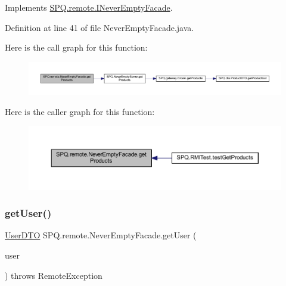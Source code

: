 Implements \mbox{\hyperlink{interface_s_p_q_1_1remote_1_1_i_never_empty_facade_a62d4a1747b8ba90f451fc9f9343055f3}{S\+P\+Q.\+remote.\+I\+Never\+Empty\+Facade}}.



Definition at line 41 of file Never\+Empty\+Facade.\+java.

Here is the call graph for this function\+:\nopagebreak
\begin{figure}[H]
\begin{center}
\leavevmode
\includegraphics[width=350pt]{class_s_p_q_1_1remote_1_1_never_empty_facade_a4c8bdeeb3d2c3eb2c28aec1043e9274f_cgraph}
\end{center}
\end{figure}
Here is the caller graph for this function\+:\nopagebreak
\begin{figure}[H]
\begin{center}
\leavevmode
\includegraphics[width=350pt]{class_s_p_q_1_1remote_1_1_never_empty_facade_a4c8bdeeb3d2c3eb2c28aec1043e9274f_icgraph}
\end{center}
\end{figure}
\mbox{\label{class_s_p_q_1_1remote_1_1_never_empty_facade_a32679a25e12c8a33e84087de357cd616}} 
\subsubsection{\texorpdfstring{get\+User()}{getUser()}}
{\footnotesize\ttfamily \mbox{\hyperlink{class_s_p_q_1_1dto_1_1_user_d_t_o}{User\+D\+TO}} S\+P\+Q.\+remote.\+Never\+Empty\+Facade.\+get\+User (\begin{DoxyParamCaption}\item[{\mbox{\hyperlink{class_s_p_q_1_1dto_1_1_user_d_t_o}{User\+D\+TO}}}]{user }\end{DoxyParamCaption}) throws Remote\+Exception}



